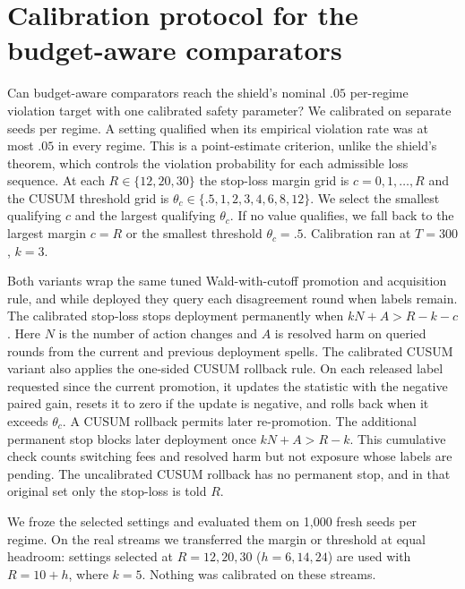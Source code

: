 \documentclass[10pt]{article}
\theoremstyle{plain}
\theoremstyle{definition}
\begin{document}
{\small}

{\small}

\section{Calibration protocol for the budget-aware comparators}\label{app:calibproto}
Can budget-aware comparators reach the shield's nominal $.05$ per-regime violation target with one calibrated safety parameter? We calibrated on \CalNSeeds{} separate seeds per regime. A setting qualified when its empirical violation rate was at most $.05$ in every regime. This is a point-estimate criterion, unlike the shield's theorem, which controls the violation probability for each admissible loss sequence. At each $R\in\{12,20,30\}$ the stop-loss margin grid is $c=0,1,\ldots,R$ and the CUSUM threshold grid is $\theta_c\in\{.5,1,2,3,4,6,8,12\}$. We select the smallest qualifying $c$ and the largest qualifying $\theta_c$. If no value qualifies, we fall back to the largest margin $c=R$ or the smallest threshold $\theta_c=.5$. Calibration ran at $T=300$, $k=3$.

Both variants wrap the same tuned Wald-with-cutoff promotion and acquisition rule, and while deployed they query each disagreement round when labels remain. The calibrated stop-loss stops deployment permanently when $kN+A>R-k-c$. Here $N$ is the number of action changes and $A$ is resolved harm on queried rounds from the current and previous deployment spells. The calibrated CUSUM variant also applies the one-sided CUSUM rollback rule. On each released label requested since the current promotion, it updates the statistic with the negative paired gain, resets it to zero if the update is negative, and rolls back when it exceeds $\theta_c$. A CUSUM rollback permits later re-promotion. The additional permanent stop blocks later deployment once $kN+A>R-k$. This cumulative check counts switching fees and resolved harm but not exposure whose labels are pending. The uncalibrated CUSUM rollback has no permanent stop, and in that original set only the stop-loss is told $R$.

We froze the selected settings and evaluated them on 1{,}000 fresh seeds per regime. On the real streams we transferred the margin or threshold at equal headroom: settings selected at $R=12,20,30$ ($h=6,14,24$) are used with $R=10+h$, where $k=5$. Nothing was calibrated on these streams.
\end{document}
